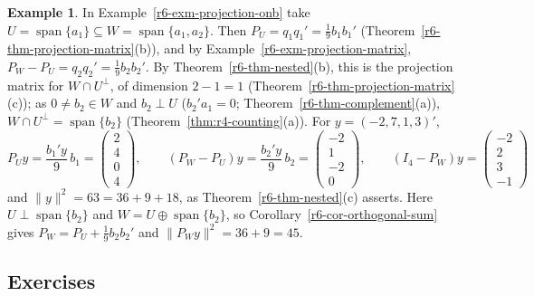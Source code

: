 \documentclass[12pt]{article}
\DeclareMathOperator{\Span}{span}
\theoremstyle{definition}
\newtheorem{example}[theorem]{Example}
\begin{document}
\begin{example}\label{r6-exm-nested}
In Example~\ref{r6-exm-projection-onb} take \(U=\Span\{a_1\}\subseteq W=\Span\{a_1,a_2\}\). Then
\(P_U=q_1q_1'=\frac19b_1b_1'\) (Theorem~\ref{r6-thm-projection-matrix}(b)), and by
Example~\ref{r6-exm-projection-matrix}, \(P_W-P_U=q_2q_2'=\frac19b_2b_2'\). By Theorem~\ref{r6-thm-nested}(b),
this is the projection matrix for \(W\cap U^\perp\), of dimension \(2-1=1\) (Theorem~\ref{r6-thm-projection-matrix}(c)); as \(0\ne b_2\in W\) and \(b_2\perp U\)
(\(b_2'a_1=0\); Theorem~\ref{r6-thm-complement}(a)), \(W\cap U^\perp=\Span\{b_2\}\) (Theorem~\ref{thm:r4-counting}(a)). For \(y=(-2,7,1,3)'\),
\[
P_Uy=\frac{b_1'y}9\,b_1=\begin{pmatrix}2\\4\\0\\4\end{pmatrix},\qquad
(P_W-P_U)y=\frac{b_2'y}9\,b_2=\begin{pmatrix}-2\\1\\-2\\0\end{pmatrix},\qquad
(I_4-P_W)y=\begin{pmatrix}-2\\2\\3\\-1\end{pmatrix}
\]
and \(\lVert y\rVert^2=63=36+9+18\), as Theorem~\ref{r6-thm-nested}(c) asserts. Here \(U\perp\Span\{b_2\}\) and
\(W=U\oplus\Span\{b_2\}\), so Corollary~\ref{r6-cor-orthogonal-sum} gives \(P_W=P_U+\frac19b_2b_2'\) and
\(\lVert P_Wy\rVert^2=36+9=45\).
\end{example}

\subsection*{Exercises}
\end{document}

